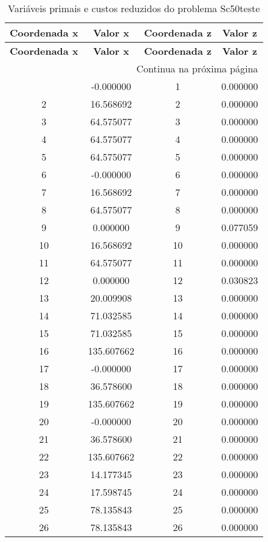 \documentclass[12pt]{article}
\begin{document}
\begin{longtable}{@{}cccc@{}}
\caption{Variáveis primais e custos reduzidos do problema Sc50teste} \\
\toprule
\textbf{Coordenada x} & \textbf{Valor x} & \textbf{Coordenada z} & \textbf{Valor z} \\
\midrule
\endfirsthead

\toprule
\textbf{Coordenada x} & \textbf{Valor x} & \textbf{Coordenada z} & \textbf{Valor z} \\
\midrule
\endhead

\midrule \multicolumn{4}{r}{{Continua na próxima página}} \\ \midrule
\endfoot

\bottomrule
\endlastfoot
1 & -0.000000 & 1 & 0.000000 \\
2 & 16.568692 & 2 & 0.000000 \\
3 & 64.575077 & 3 & 0.000000 \\
4 & 64.575077 & 4 & 0.000000 \\
5 & 64.575077 & 5 & 0.000000 \\
6 & -0.000000 & 6 & 0.000000 \\
7 & 16.568692 & 7 & 0.000000 \\
8 & 64.575077 & 8 & 0.000000 \\
9 & 0.000000 & 9 & 0.077059 \\
10 & 16.568692 & 10 & 0.000000 \\
11 & 64.575077 & 11 & 0.000000 \\
12 & 0.000000 & 12 & 0.030823 \\
13 & 20.009908 & 13 & 0.000000 \\
14 & 71.032585 & 14 & 0.000000 \\
15 & 71.032585 & 15 & 0.000000 \\
16 & 135.607662 & 16 & 0.000000 \\
17 & -0.000000 & 17 & 0.000000 \\
18 & 36.578600 & 18 & 0.000000 \\
19 & 135.607662 & 19 & 0.000000 \\
20 & -0.000000 & 20 & 0.000000 \\
21 & 36.578600 & 21 & 0.000000 \\
22 & 135.607662 & 22 & 0.000000 \\
23 & 14.177345 & 23 & 0.000000 \\
24 & 17.598745 & 24 & 0.000000 \\
25 & 78.135843 & 25 & 0.000000 \\
26 & 78.135843 & 26 & 0.000000 \\

\end{longtable}
\end{document}
